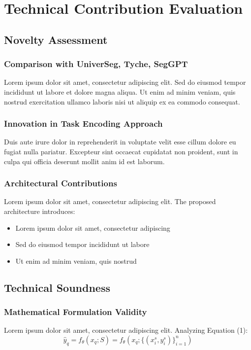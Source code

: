 \section*{Technical Contribution Evaluation}
\label{sec:technical_contribution}

\subsection{Novelty Assessment}
\subsubsection{Comparison with UniverSeg, Tyche, SegGPT}
Lorem ipsum dolor sit amet, consectetur adipiscing elit. Sed do eiusmod tempor incididunt ut labore et dolore magna aliqua. Ut enim ad minim veniam, quis nostrud exercitation ullamco laboris nisi ut aliquip ex ea commodo consequat.

\subsubsection{Innovation in Task Encoding Approach}
Duis aute irure dolor in reprehenderit in voluptate velit esse cillum dolore eu fugiat nulla pariatur. Excepteur sint occaecat cupidatat non proident, sunt in culpa qui officia deserunt mollit anim id est laborum.

\subsubsection{Architectural Contributions}
Lorem ipsum dolor sit amet, consectetur adipiscing elit. The proposed architecture introduces:
\begin{itemize}
    \item Lorem ipsum dolor sit amet, consectetur adipiscing
    \item Sed do eiusmod tempor incididunt ut labore
    \item Ut enim ad minim veniam, quis nostrud
\end{itemize}

\subsection{Technical Soundness}
\subsubsection{Mathematical Formulation Validity}
Lorem ipsum dolor sit amet, consectetur adipiscing elit. Analyzing Equation (1):
\begin{equation}
    \hat{y}_q = f_\theta(x_q; S) = f_\theta(x_q; \{(x_i^s, y_i^s)\}_{i=1}^n)
\end{equation}

